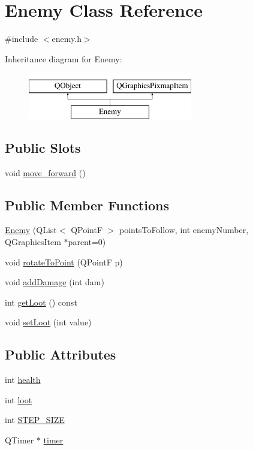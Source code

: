 \hypertarget{class_enemy}{}\section{Enemy Class Reference}
\label{class_enemy}


{\ttfamily \#include $<$enemy.\+h$>$}

Inheritance diagram for Enemy\+:\begin{figure}[H]
\begin{center}
\leavevmode
\includegraphics[height=2.000000cm]{class_enemy}
\end{center}
\end{figure}
\subsection*{Public Slots}
\begin{DoxyCompactItemize}
\item 
void \hyperlink{class_enemy_afa4cb14cbeaf872456d223cb8a314928}{move\+\_\+forward} ()
\end{DoxyCompactItemize}
\subsection*{Public Member Functions}
\begin{DoxyCompactItemize}
\item 
\hyperlink{class_enemy_abfd2025e0660f920746f930d59b38bf0}{Enemy} (Q\+List$<$ Q\+PointF $>$ points\+To\+Follow, int enemy\+Number, Q\+Graphics\+Item $\ast$parent=0)
\item 
void \hyperlink{class_enemy_aed33c099d6ec54e1c6cfb676ac38de5b}{rotate\+To\+Point} (Q\+PointF p)
\item 
void \hyperlink{class_enemy_ac7a5e3a071bcc4d67300cfae9446e0bd}{add\+Damage} (int dam)
\item 
int \hyperlink{class_enemy_ab680828a4c84c33a66bea01178cdf3e3}{get\+Loot} () const
\item 
void \hyperlink{class_enemy_ad4139e522aa32c491271155adfb053f0}{set\+Loot} (int value)
\end{DoxyCompactItemize}
\subsection*{Public Attributes}
\begin{DoxyCompactItemize}
\item 
int \hyperlink{class_enemy_aedd5e7bf8ef07ee97be433c853a10d8d}{health}
\item 
int \hyperlink{class_enemy_a8f007e72b954c077e5433a111def78c3}{loot}
\item 
int \hyperlink{class_enemy_aa949fdeff0f2f52bc9e779e69dfc27e0}{S\+T\+E\+P\+\_\+\+S\+I\+ZE}
\item 
Q\+Timer $\ast$ \hyperlink{class_enemy_a70012228edd80bdbf5d71374f0b7ef9e}{timer}
\end{DoxyCompactItemize}

